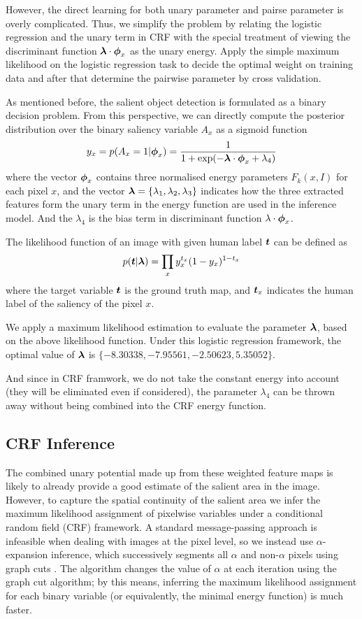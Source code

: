 \documentclass[10pt,twocolumn,letterpaper]{article}
\begin{document}
However, the direct learning for both unary parameter and pairse parameter is overly complicated. Thus, we simplify the problem by relating the logistic regression and the unary term in CRF with the special treatment of viewing the discriminant function $\boldsymbol{\lambda} \cdot \boldsymbol{\phi}_x$ as the unary energy. Apply the simple maximum likelihood on the logistic regression task to decide the optimal weight on training data and after that determine the pairwise parameter by cross validation.

As mentioned before, the salient object detection is formulated as a binary decision problem. From this perspective, we can directly compute the posterior distribution over the binary saliency variable $A_x$ as a sigmoid function
$$ y_x = p ( A_x = 1 | \boldsymbol{\phi}_x) = \frac{1}{1 + \exp(-\boldsymbol{\lambda} \cdot \boldsymbol{\phi}_x + \lambda_4)}$$
where the vector $\boldsymbol{\phi}_x$ contains three normalised energy parameters $F_k (x, I)$ for each pixel $x$, and the vector $\boldsymbol{\lambda} = \{ \lambda_1, \lambda_2, \lambda_3\}$ indicates how the three extracted features form the unary term in the energy function are used in the inference model. And the $\lambda_4$ is the bias term in discriminant function $\lambda \cdot \boldsymbol{\phi}_x$.

The likelihood function of an image with given human label $\boldsymbol{t}$ can be defined as
$$ p( \boldsymbol{t} | \boldsymbol{\lambda}) = \prod_{x} y_{x}^{t_{x}} (1 - y_{x})^{1-t_x} $$
where the target variable $\boldsymbol{t}$ is the ground truth map, and $\boldsymbol{t}_x$ indicates the human label of the saliency of the pixel $x$. 

We apply a maximum likelihood estimation to evaluate the parameter $\boldsymbol{\lambda}$, based on the above likelihood function.  Under this logistic regression framework, the optimal value of $\boldsymbol{\lambda}$ is $\{-8.30338 ,-7.95561, -2.50623, 5.35052\}$. 

And since in CRF framwork, we do not take the constant energy into account (they will be eliminated even if considered), the parameter $\lambda_4$ can be thrown away without being combined into the CRF energy function.

\subsection{CRF Inference}
The combined unary potential made up from these weighted feature maps is likely to already provide a good estimate of the salient area in the image.  However, to capture the spatial continuity of the salient area we infer the maximum likelihood assignment of pixelwise variables under a conditional random field (CRF) framework.  A standard message-passing approach is infeasible when dealing with images at the pixel level, so we instead use $\alpha$-expansion inference, which successively segments all $\alpha$ and non-$\alpha$ pixels using graph cuts \cite{graphcut}.  The algorithm changes the value of $\alpha$ at each iteration using the graph cut algorithm; by this means, inferring the maximum likelihood assignment for each binary variable (or equivalently, the minimal energy function) is much faster. 
\end{document}
